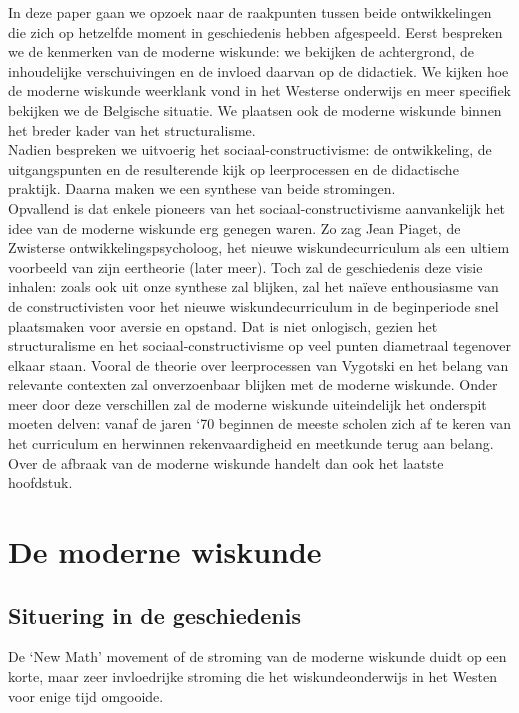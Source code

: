 \documentclass[a4paper,11pt]{article}
\begin{document}
\noindent In deze paper gaan we opzoek naar de raakpunten tussen beide ontwikkelingen die 
zich op hetzelfde moment in geschiedenis hebben afgespeeld. Eerst bespreken we de 
kenmerken van de moderne wiskunde: we bekijken de achtergrond, de inhoudelijke verschuivingen
en de invloed daarvan op de didactiek. We kijken hoe de moderne wiskunde weerklank vond in het Westerse onderwijs en meer specifiek bekijken we de Belgische situatie. We plaatsen ook de moderne wiskunde binnen het breder kader van
het structuralisme. \\

\noindent Nadien bespreken we uitvoerig het sociaal-constructivisme: de ontwikkeling, de uitgangspunten en de resulterende
kijk op leerprocessen en de didactische praktijk. Daarna maken we een synthese 
van beide stromingen. \\

\noindent Opvallend is dat enkele pioneers van het 
sociaal-constructivisme aanvankelijk het idee van de moderne wiskunde erg 
genegen waren. Zo zag Jean Piaget, de Zwisterse ontwikkelingspsycholoog, het 
nieuwe wiskundecurriculum als een ultiem voorbeeld van zijn eertheorie (later meer). Toch 
zal de geschiedenis deze visie inhalen: zoals ook uit onze synthese zal blijken, 
zal het naïeve enthousiasme van de constructivisten voor het nieuwe wiskundecurriculum in de beginperiode snel 
plaatsmaken voor aversie en opstand. Dat is niet onlogisch, gezien het 
structuralisme en het sociaal-constructivisme op veel punten diametraal 
tegenover elkaar staan. Vooral de theorie over leerprocessen van Vygotski en het belang van relevante contexten  zal onverzoenbaar blijken met de moderne wiskunde. 
Onder meer door deze verschillen zal de moderne wiskunde uiteindelijk het 
onderspit moeten delven: vanaf de jaren `70 beginnen de meeste scholen zich af te 
keren van het curriculum en herwinnen rekenvaardigheid en meetkunde terug aan 
belang. Over de afbraak van de moderne wiskunde handelt dan ook het laatste 
hoofdstuk.

\newpage
\section{De moderne wiskunde}
\subsection{Situering in de geschiedenis}
De `New Math' movement of de stroming van de moderne wiskunde duidt op een 
korte, maar zeer invloedrijke stroming die het wiskundeonderwijs in het Westen 
voor enige tijd omgooide. \\
\end{document}
